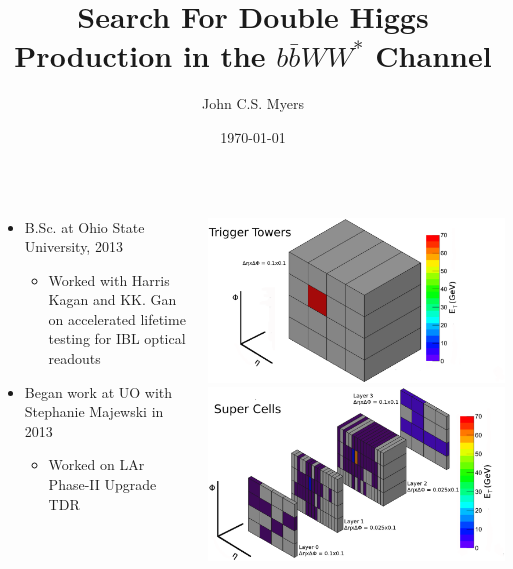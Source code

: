 \documentclass{beamer}
\title{Search For Double Higgs Production in the $b\bar{b}WW^{*}$ Channel}
\subtitle{}
\author[John C.S. Myers]{John C.S. Myers}
\institute[University of Oregon]{ University of Oregon}
\date{\today}
\newcommand*{\header}[1]{\fontsize{16}{8}\selectfont \textbf{{\color{MyPurple}{#1}}}}
\begin{document}
\titlepage


\begin{frame}
\begin{center}
\header{About Me}
\end{center}
\begin{columns}
\begin{column}{0.8\textwidth}
\begin{itemize}
\small
\item{B.Sc. at Ohio State University, 2013}
\begin{itemize}
\footnotesize
\item Worked with Harris Kagan and KK. Gan on accelerated lifetime testing for IBL optical readouts
\end{itemize}
\item Began work at UO with Stephanie Majewski in 2013
\begin{itemize}
\footnotesize
\item Worked on LAr Phase-II Upgrade TDR
\end{itemize}
\end{itemize}
\end{column}
\begin{column}{0.2\textwidth}
\begin{center}
\vspace{-1cm}
\includegraphics[width=1.2\textwidth]{figures/fig_01a}\\
\includegraphics[width=1.2\textwidth]{figures/fig_01b}

\end{center}
\end{column}
\end{columns}
\end{frame}
\end{document}
